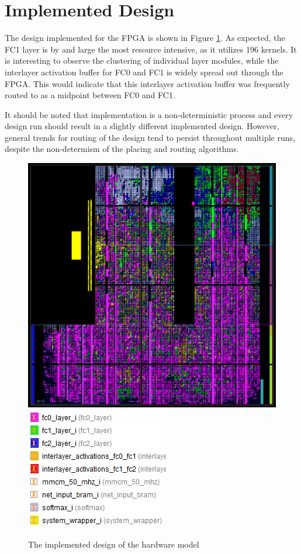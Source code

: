 \section{Implemented Design}
The design implemented for the FPGA is shown in Figure \ref{impl-design}. As expected, the FC1 layer is by and large the most resource intensive, as it utilizes 196 kernels. It is interesting to observe the clustering of individual layer modules, while the interlayer activation buffer for FC0 and FC1 is widely spread out through the FPGA. This would indicate that this interlayer activation buffer was frequently routed to as a midpoint between FC0 and FC1. 

It should be noted that implementation is a non-deterministic process and every design run should result in a slightly different implemented design. However, general trends for routing of the design tend to  persist throughout multiple runs, despite the non-determism of the placing and routing algorithms.

\begin{figure}
	\centering
	\includegraphics[width=\textwidth]{figures/impl_design}
	\includegraphics{figures/impl_design_legend}
	\caption{The implemented design of the hardware model}
	\label{impl-design}
\end{figure}

